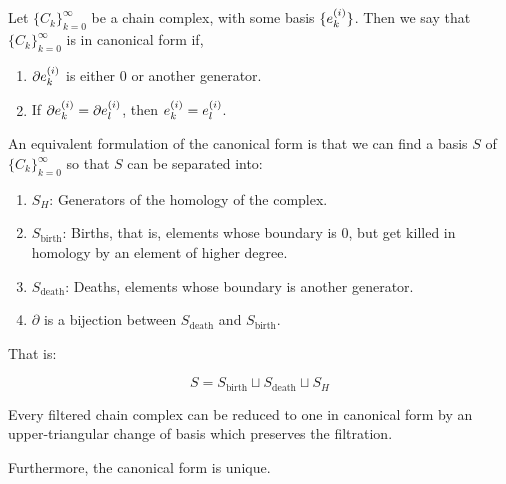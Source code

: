 \begin{definition}

Let $\{C_k\}_{k=0}^{\infty}$ be a chain complex, with some basis $\{e_{k}^{(i)}\}$.
Then we say that $\{C_k\}_{k=0}^{\infty}$ is in canonical form if,

\begin{enumerate}
\item $\partial e_{k}^{(i)}$
is either $0$ or another generator.

\item If $\partial e_{k}^{(i)}=\partial e_{l}^{(i)}$,
then $e_{k}^{(i)}= e_{l}^{(i)}$.
\end{enumerate}

\end{definition}

\begin{remark}
\label{canonicalformsplit}
An equivalent formulation of the canonical form is that we can find a basis $S$ 
of $\{C_k\}_{k=0}^{\infty}$ so that $S$
can be separated into: 
\begin{enumerate}
\item $S_H$: Generators of the homology of the complex.

\item $S_{\text{birth}}$: Births, that is, elements whose boundary is $0$, but get killed in homology by an element of higher degree.

\item $S_{\text{death}}$: Deaths, elements whose boundary is another generator. 

\item $\partial$ is a bijection between $S_{\text{death}}$ 
and $S_{\text{birth}}$.
\end{enumerate}

That is:

$$
S=S_{\text{birth}}\sqcup
S_{\text{death}}\sqcup
 S_H
$$ 
\end{remark}

\begin{theorem}
\cite{bar1994}
\label{canonicalform}
Every filtered chain complex can be reduced to 
one in canonical form by an upper-triangular change of basis
which preserves the filtration.

Furthermore, the canonical form is unique.
\end{theorem}

%

%
%
%

